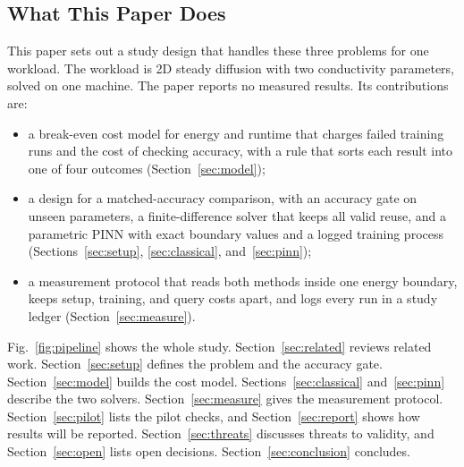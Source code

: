 \documentclass[journal]{IEEEtran}
\begin{document}
\subsection{What This Paper Does}
This paper sets out a study design that handles these three problems for one workload. The workload is 2D steady diffusion with two conductivity parameters, solved on one machine. The paper reports no measured results. Its contributions are:
\begin{itemize}
\item a break-even cost model for energy and runtime that charges failed training runs and the cost of checking accuracy, with a rule that sorts each result into one of four outcomes (Section~\ref{sec:model});
\item a design for a matched-accuracy comparison, with an accuracy gate on unseen parameters, a finite-difference solver that keeps all valid reuse, and a parametric PINN with exact boundary values and a logged training process (Sections~\ref{sec:setup}, \ref{sec:classical}, and~\ref{sec:pinn});
\item a measurement protocol that reads both methods inside one energy boundary, keeps setup, training, and query costs apart, and logs every run in a study ledger (Section~\ref{sec:measure}).
\end{itemize}

Fig.~\ref{fig:pipeline} shows the whole study. Section~\ref{sec:related} reviews related work. Section~\ref{sec:setup} defines the problem and the accuracy gate. Section~\ref{sec:model} builds the cost model. Sections~\ref{sec:classical} and~\ref{sec:pinn} describe the two solvers. Section~\ref{sec:measure} gives the measurement protocol. Section~\ref{sec:pilot} lists the pilot checks, and Section~\ref{sec:report} shows how results will be reported. Section~\ref{sec:threats} discusses threats to validity, and Section~\ref{sec:open} lists open decisions. Section~\ref{sec:conclusion} concludes.
\end{document}
